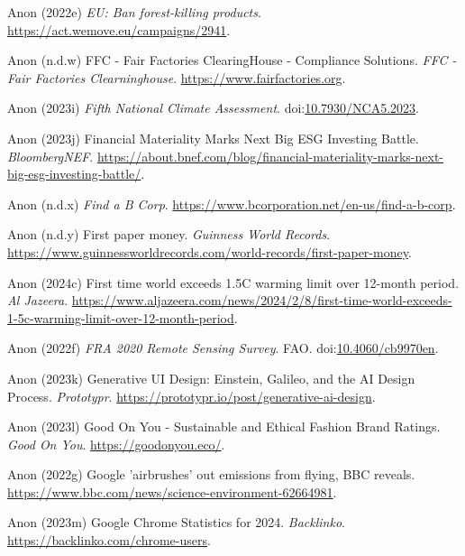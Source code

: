 \documentclass[
  letterpaper,
  DIV=11,
  numbers=noendperiod]{scrartcl}
\newlength{\cslhangindent}
\newenvironment{CSLReferences}[2] %
 {\begin{list}{}{%
  \setlength{\itemindent}{0pt}
  \setlength{\leftmargin}{0pt}
  \setlength{\parsep}{0pt}
  \ifodd #1
   \setlength{\leftmargin}{\cslhangindent}
   \setlength{\itemindent}{-1\cslhangindent}
  \fi
  \setlength{\itemsep}{#2\baselineskip}}}
 {\end{list}}
\begin{document}
\begin{CSLReferences}{0}{1}
Anon (2022e) \emph{{EU}: {Ban} forest-killing products}.
\url{https://act.wemove.eu/campaigns/2941}.

Anon (n.d.w) {FFC} - {Fair Factories ClearingHouse} - {Compliance
Solutions}. \emph{FFC - Fair Factories Clearninghouse}.
\url{https://www.fairfactories.org}.

Anon (2023i) \emph{Fifth {National Climate Assessment}}.
doi:\href{https://doi.org/10.7930/NCA5.2023}{10.7930/NCA5.2023}.

Anon (2023j) Financial {Materiality Marks Next Big ESG Investing
Battle}. \emph{BloombergNEF}.
\url{https://about.bnef.com/blog/financial-materiality-marks-next-big-esg-investing-battle/}.

Anon (n.d.x) \emph{Find a {B Corp}}.
\url{https://www.bcorporation.net/en-us/find-a-b-corp}.

Anon (n.d.y) First paper money. \emph{Guinness World Records}.
\url{https://www.guinnessworldrecords.com/world-records/first-paper-money}.

Anon (2024c) First time world exceeds 1.{5C} warming limit over 12-month
period. \emph{Al Jazeera}.
\url{https://www.aljazeera.com/news/2024/2/8/first-time-world-exceeds-1-5c-warming-limit-over-12-month-period}.

Anon (2022f) \emph{{FRA} 2020 {Remote Sensing Survey}}. FAO.
doi:\href{https://doi.org/10.4060/cb9970en}{10.4060/cb9970en}.

Anon (2023k) Generative {UI Design}: {Einstein}, {Galileo}, and the {AI
Design Process}. \emph{Prototypr}.
\url{https://prototypr.io/post/generative-ai-design}.

Anon (2023l) Good {On You} - {Sustainable} and {Ethical Fashion Brand
Ratings}. \emph{Good On You}. \url{https://goodonyou.eco/}.

Anon (2022g) Google 'airbrushes' out emissions from flying, {BBC}
reveals. \url{https://www.bbc.com/news/science-environment-62664981}.

Anon (2023m) Google {Chrome Statistics} for 2024. \emph{Backlinko}.
\url{https://backlinko.com/chrome-users}.


\end{CSLReferences}
\end{document}
